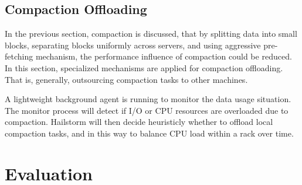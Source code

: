 \documentclass[a4paper,10pt,twoside]{article}
\begin{document}
\subsection{Compaction Offloading}
\par
In the previous section, compaction is discussed, that by splitting data into small blocks, separating blocks uniformly across servers, 
and using aggressive pre-fetching mechanism, the performance influence of compaction could be reduced.
In this section, specialized mechanisms are applied for compaction offloading.
That is, generally, outsourcing compaction tasks to other machines.
\par
A lightweight background agent is running to monitor the data usage situation. 
The monitor process will detect if I/O or CPU resources are overloaded due to compaction.
Hailstorm will then decide heuristicly whether to offload local compaction tasks, and in this way to balance CPU load within a rack over time.


\section{Evaluation}
\end{document}
